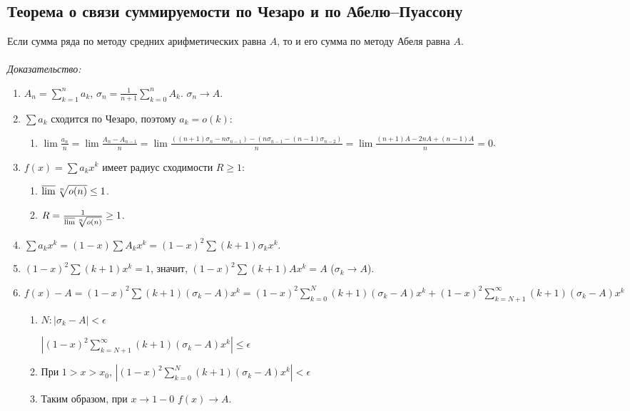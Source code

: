 \documentclass[paper=a4, fontsize=11pt]{article}
\begin{document}
\subsection{Теорема о связи суммируемости по Чезаро и по Абелю--Пуассону}
Если сумма ряда по методу средних арифметических равна $A$, то и его сумма по методу Абеля равна $A$.
\\\\
\emph{Доказательство:}
\begin{enumerate}
    \item $A_n = \sum_{k=1}^n a_k$, $\sigma_n = \frac{1}{n+1} \sum_{k=0}^n A_k$. $\sigma_n \to A$.
    \item $\sum a_k$ сходится по Чезаро, поэтому $a_k = o(k)$:
    \begin{enumerate}
        \item $\lim \frac{a_n}{n} = \lim \frac{A_n - A_{n-1}}{n} =
        \lim \frac{((n+1)\sigma_n - n\sigma_{n-1}) - (n\sigma_{n-1} - (n-1)\sigma_{n-2})}{n} =
        \lim \frac{(n+1)A - 2nA + (n-1)A}{n} = 0$.
    \end{enumerate}
    \item $f(x) = \sum a_k x^k$ имеет радиус сходимости $R \geq 1$:
    \begin{enumerate}
        \item $\varlimsup \sqrt[n]{o(n)} \leq 1$.
        \item $R = \frac{1}{\varlimsup \sqrt[n]{o(n)}} \geq 1$.
    \end{enumerate}
    \item $\sum a_k x^k = (1-x) \sum A_k x^k = (1-x)^2 \sum (k+1)\sigma_k x^k$.
    \item $(1-x)^2 \sum (k+1) x^k = 1$, значит, $(1-x)^2 \sum (k+1) A x^k = A$ ($\sigma_k \to A$).
    \item $f(x) - A = (1-x)^2 \sum (k+1)(\sigma_k-A)x^k =
    (1-x)^2 \sum_{k=0}^N (k+1)(\sigma_k-A)x^k + (1-x)^2 \sum_{k=N+1}^{\infty} (k+1)(\sigma_k-A)x^k$
    \begin{enumerate}
        \item $N: |\sigma_k - A| < \epsilon$

        $|(1-x)^2 \sum_{k=N+1}^{\infty} (k+1)(\sigma_k-A)x^k| \leq \epsilon$
        \item При $1 > x > x_0$, $|(1-x)^2 \sum_{k=0}^N (k+1)(\sigma_k-A)x^k| < \epsilon$
        \item Таким образом, при $x \to 1-0$ $f(x) \to A$.
    \end{enumerate}
\end{enumerate}
\end{document}
